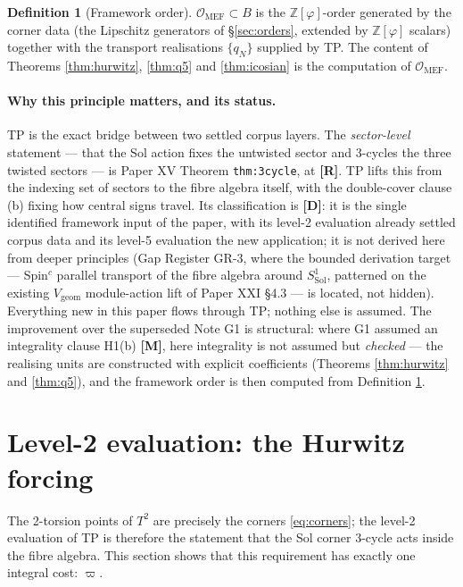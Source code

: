 \documentclass[11pt,a4paper]{article}
\theoremstyle{plain}
\theoremstyle{definition}
\newtheorem{definition}{Definition}
\theoremstyle{remark}
\newcommand{\Zphi}{\mathbb{Z}[\varphi]}
\newcommand{\OrderMEF}{\mathcal{O}_{\mathrm{MEF}}}
\newcommand{\rtag}[1]{\textnormal{\textbf{[#1]}}}
\begin{document}
\begin{definition}[Framework order]\label{def:order}
$\OrderMEF \subset B$ is the $\Zphi$-order generated by the corner data (the Lipschitz generators of \S\ref{sec:orders}, extended by $\Zphi$ scalars) together with the transport realisations $\{q_N\}$ supplied by TP. The content of Theorems \ref{thm:hurwitz}, \ref{thm:q5} and \ref{thm:icosian} is the computation of $\OrderMEF$.
\end{definition}

\paragraph{Why this principle matters, and its status.}
TP is the exact bridge between two settled corpus layers. The \emph{sector-level} statement --- that the Sol action fixes the untwisted sector and 3-cycles the three twisted sectors --- is Paper XV Theorem \texttt{thm:3cycle}, at \rtag{R}. TP lifts this from the indexing set of sectors to the fibre algebra itself, with the double-cover clause (b) fixing how central signs travel. Its classification is \rtag{D}: it is the single identified framework input of the paper, with its level-2 evaluation already settled corpus data and its level-5 evaluation the new application; it is not derived here from deeper principles (Gap Register GR-3, where the bounded derivation target --- Spin$^c$ parallel transport of the fibre algebra around $S^1_{\mathrm{Sol}}$, patterned on the existing $V_{\mathrm{geom}}$ module-action lift of Paper XXI \S4.3 --- is located, not hidden). Everything new in this paper flows through TP; nothing else is assumed. The improvement over the superseded Note G1 is structural: where G1 assumed an integrality clause H1(b) \rtag{M}, here integrality is not assumed but \emph{checked} --- the realising units are constructed with explicit coefficients (Theorems \ref{thm:hurwitz} and \ref{thm:q5}), and the framework order is then computed from Definition \ref{def:order}.

\section{Level-2 evaluation: the Hurwitz forcing}\label{sec:level2}

The 2-torsion points of $T^2$ are precisely the corners \eqref{eq:corners}; the level-2 evaluation of TP is therefore the statement that the Sol corner 3-cycle acts inside the fibre algebra. This section shows that this requirement has exactly one integral cost: $\varpi$.
\end{document}
